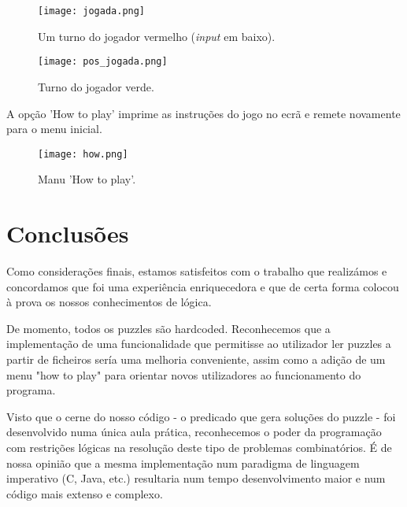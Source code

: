 \documentclass[a4paper]{article}
\begin{document}
\begin{figure}
\caption{Um turno do jogador vermelho (\textit{input} em baixo).}
\centering
\texttt{[image: jogada.png]}
\end{figure}

\begin{figure}
\caption{Turno do jogador verde.}
\centering
\texttt{[image: pos\_jogada.png]}
\end{figure}

A opção 'How to play' imprime as instruções do jogo no ecrã e remete novamente para o menu inicial.

\begin{figure}
\caption{Manu 'How to play'.}
\centering
\texttt{[image: how.png]}
\end{figure}



\section{Conclusões}
Como considerações finais, estamos satisfeitos com o trabalho que realizámos e concordamos que foi uma experiência enriquecedora e que de certa forma colocou à prova os nossos conhecimentos de lógica.

De momento, todos os puzzles são hardcoded. Reconhecemos que a implementação de uma funcionalidade que permitisse ao utilizador ler puzzles a partir de ficheiros sería uma melhoria conveniente, assim como a adição de um menu "how to play" para orientar novos utilizadores ao funcionamento do programa.

Visto que o cerne do nosso código - o predicado que gera soluções do puzzle - foi desenvolvido numa única aula prática, reconhecemos o poder da programação com restrições lógicas na resolução deste tipo de problemas combinatórios. É de nossa opinião que a mesma implementação num paradigma de linguagem imperativo (C, Java, etc.) resultaria num tempo desenvolvimento maior e num código mais extenso e complexo.

\end{document}
